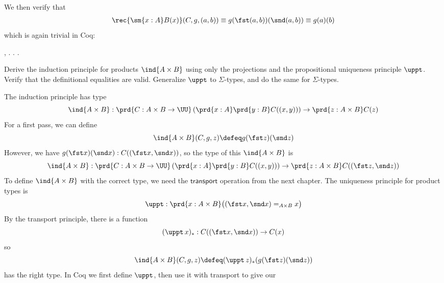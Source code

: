 \noindent
We then verify that
\begin{align*}
\rec{\sm{x:A}B(x)}(C, g, (a, b))
\equiv g(\fst (a, b))(\snd (a, b))
\equiv g(a)(b)
\end{align*}
which is again trivial in Coq: \begin{coqdoccode}
\coqdocemptyline
\coqdocnoindent
{} \coqdockw{\ensuremath{\forall}}    ,    \coqdocnotation{(}\coqdocnotation{;} \coqdocnotation{)} \coqdocnotation{=}   . . .\coqdoceol
\coqdocemptyline
\coqdocemptyline
\end{coqdoccode}
Derive the induction principle for products $\ind{A \times B}$ using only the
projections and the propositional uniqueness principle $\uppt$.  Verify that
the definitional equalities are valid.  Generalize $\uppt$ to $\Sigma$-types,
and do the same for $\Sigma$-types. \begin{coqdoccode}
\coqdocemptyline
\end{coqdoccode}
\soln 
The induction principle has type
\[
\ind{A\times B} : \prd{C: A\times B \to \UU}\left(\prd{x:A}\prd{y:B}C((x,
y))\right) \to \prd{z:A\times B}C(z)
\]
For a first pass, we can define
\[
\ind{A\times B}(C, g, z)
\defeq
g(\fst z)(\snd z)
\]
However, we have $g(\fst x)(\snd x) : C((\fst x, \snd x))$, so the type of this
$\ind{A \times B}$ is
\[
\ind{A\times B} : \prd{C: A\times B \to \UU}\left(\prd{x:A}\prd{y:B}C((x,
y))\right) \to \prd{z:A\times B}C((\fst z, \snd z))
\]
To define $\ind{A \times B}$ with the correct type, we need the
$\mathsf{transport}$ operation from the next chapter.  The uniqueness principle
for product types is
\[
\uppt : \prd{x : A \times B} \big((\fst x, \snd x) =_{A \times B} x\big)
\]
By the transport principle, there is a function
\[
(\uppt\, x)_{*} : C((\fst x, \snd x)) \to C(x)
\]
so
\[
\ind{A \times B}(C, g, z)
\defeq
(\uppt\, z)_{*}(g(\fst z)(\snd z))
\]
has the right type.
In Coq we first define $\uppt$, then use it with transport to give our
